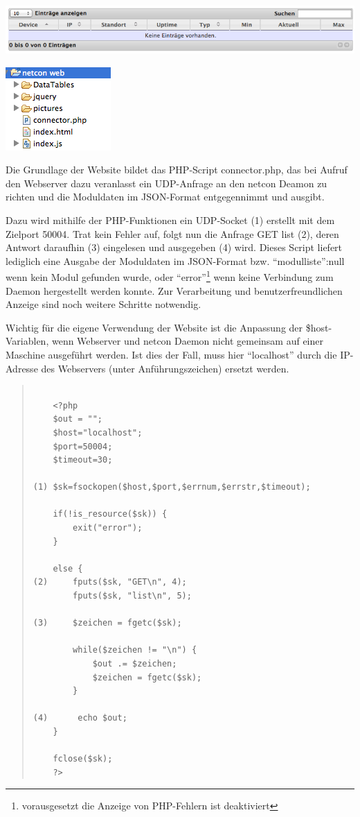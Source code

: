 \documentclass[a4paper,14pt,headsepline]{scrartcl}
\begin{document}
\includegraphics[width=0.85 \paperwidth]{./bilder/no_modules.png} 

\newpage

\begin{center}
\includegraphics[width=0.20 \paperwidth]{./bilder/website_aufbau.png}
\end{center}

Die Grundlage der Website bildet das PHP-Script connector.php, das bei Aufruf den Webserver dazu veranlasst ein UDP-Anfrage an den netcon Deamon zu richten und die Moduldaten im JSON-Format entgegennimmt und ausgibt. 

Dazu wird mithilfe der PHP-Funktionen ein UDP-Socket (1) erstellt mit dem Zielport 50004. Trat kein Fehler auf, folgt nun die Anfrage GET list (2), deren Antwort daraufhin (3) eingelesen und ausgegeben (4) wird. Dieses Script liefert lediglich eine Ausgabe der Moduldaten im JSON-Format bzw. {``modulliste'':null} wenn kein Modul gefunden wurde, oder ``error''\footnote{vorausgesetzt die Anzeige von PHP-Fehlern ist deaktiviert} wenn keine Verbindung zum Daemon hergestellt werden konnte. Zur Verarbeitung und benutzerfreundlichen Anzeige sind noch weitere Schritte notwendig.  

Wichtig für die eigene Verwendung der Website ist die Anpassung der \$host-Variablen, wenn Webserver und netcon Daemon nicht gemeinsam auf einer Maschine ausgeführt werden. Ist dies der Fall, muss hier ``localhost'' durch die IP-Adresse des Webservers (unter Anführungszeichen) ersetzt werden.  

\newpage

\begin{quote}
\begin{verbatim}

    <?php
    $out = "";
    $host="localhost";
    $port=50004;
    $timeout=30;

(1) $sk=fsockopen($host,$port,$errnum,$errstr,$timeout);

    if(!is_resource($sk)) {				
        exit("error");		
    }

    else {					
(2)     fputs($sk, "GET\n", 4);
        fputs($sk, "list\n", 5);
        					
(3)     $zeichen = fgetc($sk);
    				
        while($zeichen != "\n") {
            $out .= $zeichen;
            $zeichen = fgetc($sk);
        }	
    				
(4)      echo $out;					
    }	
		
    fclose($sk);	
    ?>

\end{verbatim}
\end{quote} 
\end{document}
